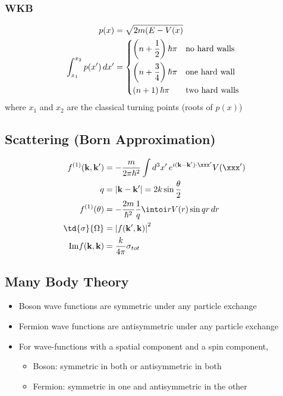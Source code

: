 \documentclass[11pt]{article}
\begin{document}
\subsubsection{WKB}
\label{sec:org2014454}
\begin{align*}
p(x) & = \sqrt{2m(E - V(x)} \\
\int_{x_1}^{x_2} p(x') \, dx' & = \begin{dcases*}
                                        \left( n + \frac{1}{2} \right) \hbar \pi & no hard walls \\
                                        \left( n + \frac{3}{4} \right) \hbar \pi & one hard wall \\
                                        \left( n + 1 \right)           \hbar \pi & two hard walls \\
                                  \end{dcases*}
\end{align*}
where \(x_1\) and \(x_2\) are the classical turning points (roots of \(p(x)\))

\subsection{Scattering (Born Approximation)}
\label{sec:org0ddb507}
\begin{align*}
f^{(1)}(\mathbf{k}, \mathbf{k}') & = -\frac{m}{2\pi \hbar^2} \int d^3 x' \, e^{i(\mathbf{k} - \mathbf{k}') \cdot \xxx'} V(\xxx') \\
q & = \left| \mathbf{k} - \mathbf{k}' \right| = 2k \sin \frac{\theta}{2} \\
f^{(1)}(\theta) & = -\frac{2m}{\hbar^2} \frac{1}{q} \intoi r V(r) \sin qr \, dr \\
\td{\sigma}{\Omega} & = \left| f(\mathbf{k}', \mathbf{k}) \right|^2 \\
\mathrm{Im} f(\mathbf{k}, \mathbf{k}) & = \frac{k}{4\pi} \sigma_{tot}
\end{align*}

\subsection{Many Body Theory}
\label{sec:org8076df5}
\begin{itemize}
\item Boson wave functions are symmetric under any particle exchange
\item Fermion wave functions are antisymmetric under any particle exchange
\item For wave-functions with a spatial component and a spin component,
\begin{itemize}
\item Boson: symmetric in both or antisymmetric in both
\item Fermion: symmetric in one and antisymmetric in the other
\end{itemize}
\end{itemize}
\end{document}
